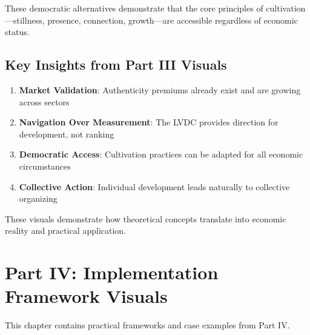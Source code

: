 \documentclass[
  a4paper,
]{report}
\providecommand{\tightlist}{%
  \setlength{\itemsep}{0pt}\setlength{\parskip}{0pt}}
\begin{document}
\begin{landscape}
\end{landscape}

\begin{tcolorbox}[enhanced jigsaw, toprule=.15mm, rightrule=.15mm, breakable, opacitybacktitle=0.6, colframe=quarto-callout-tip-color-frame, colback=white, titlerule=0mm, arc=.35mm, leftrule=.75mm, opacityback=0, colbacktitle=quarto-callout-tip-color!10!white, bottomrule=.15mm, coltitle=black, toptitle=1mm, bottomtitle=1mm, title=\textcolor{quarto-callout-tip-color}{\faLightbulb}\hspace{0.5em}{Tip}, left=2mm]

These democratic alternatives demonstrate that the core principles of
cultivation---stillness, presence, connection, growth---are accessible
regardless of economic status.

\end{tcolorbox}

\section{Key Insights from Part III
Visuals}\label{key-insights-from-part-iii-visuals}

\begin{enumerate}
\def\labelenumi{\arabic{enumi}.}
\tightlist
\item
  \textbf{Market Validation}: Authenticity premiums already exist and
  are growing across sectors
\item
  \textbf{Navigation Over Measurement}: The LVDC provides direction for
  development, not ranking
\item
  \textbf{Democratic Access}: Cultivation practices can be adapted for
  all economic circumstances
\item
  \textbf{Collective Action}: Individual development leads naturally to
  collective organizing
\end{enumerate}

These visuals demonstrate how theoretical concepts translate into
economic reality and practical application.


\chapter{Part IV: Implementation Framework
Visuals}\label{part-iv-implementation-framework-visuals}

This chapter contains practical frameworks and case examples from Part
IV.
\end{document}
